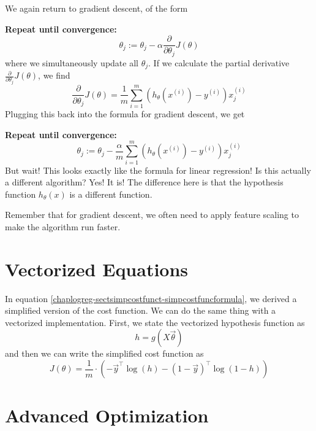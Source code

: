 We again return to gradient descent, of the form 


\textbf{Repeat until convergence:}
\begin{equation}
\theta_j := \theta_j - \alpha \frac{\partial}{\partial \theta_j} J\left( \theta \right)
\end{equation}
where we simultaneously update all $\theta_j$. If we calculate the partial derivative $\frac{\partial}{\partial \theta_j} J\left(\theta\right)$, we find
\begin{equation}
\frac{\partial}{\partial \theta_j} J\left(\theta\right) = \frac{1}{m}\sum_{i=1}^m \left( h_\theta\left(x^{\left(i\right)}\right) - y^{\left(i\right)}\right) x_j^{\left(i\right)}
\end{equation}
Plugging this back into the formula for gradient descent, we get


\textbf{Repeat until convergence:}
\begin{equation}
\theta_j := \theta_j - \frac{\alpha}{m} \sum_{i=1}^m \left( h_\theta\left(x^{\left(i\right)}\right) - y^{\left(i\right)}\right) x_j^{\left(i\right)}
\end{equation}
But wait! This looks exactly like the formula for linear regression! Is this actually a different algorithm? Yes! It is! The difference here is that the hypothesis function $h_\theta\left(x\right)$ is a different function. 

Remember that for gradient descent, we often need to apply feature scaling to make the algorithm run faster. 


\section{Vectorized Equations}
In equation \ref{chaplogreg-sectsimpcostfunct-simpcostfuncformula}, we derived a simplified version of the cost function. We can do the same thing with a vectorized implementation. First, we state the vectorized hypothesis function as
\begin{equation}
h = g\left( X\vec{\theta}\right)
\end{equation}
and then we can write the simplified cost function as
\begin{equation}
J\left(\theta\right) = \frac{1}{m}\cdot \left( -\vec{y}^\intercal \log\left(h\right) - \left(1 - \vec{y}\right)^\intercal \log \left(1 - h\right)\right)
\end{equation}


\section{Advanced Optimization}

